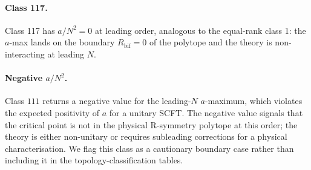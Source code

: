 \paragraph{Class 117.}  Class 117 has $a/N^{2}=0$ at leading order,
analogous to the equal-rank class 1: the $a$-max lands on the boundary
$R_{\text{bif}}=0$ of the polytope and the theory is non-interacting
at leading $N$.

\paragraph{Negative $a/N^{2}$.}  Class $111$ returns a negative value
for the leading-$N$ $a$-maximum, which violates the expected
positivity of $a$ for a unitary SCFT.  The negative value signals
that the critical point is not in the physical R-symmetry polytope at
this order; the theory is either non-unitary or requires
subleading corrections for a physical characterisation.  We flag this
class as a cautionary boundary case rather than including it in the
topology-classification tables.
